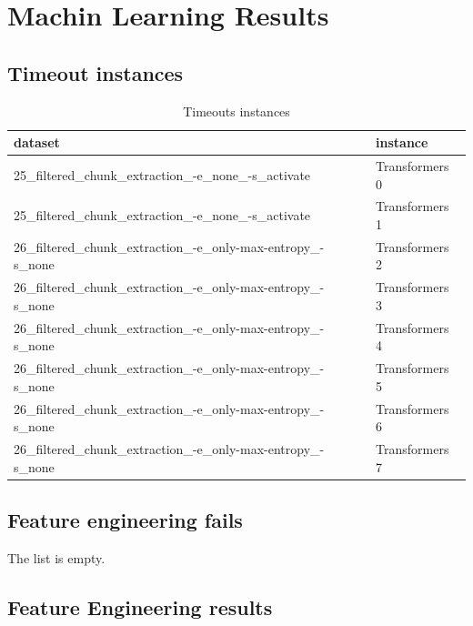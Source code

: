 \chapter{Machin Learning Results}
\section{Timeout instances}

\label{sec:annexe:timeout_instances}

\begin{table}[h]
\centering
\begin{tabular}{ll}
\hline
dataset & instance \\ 
\hline
25\_filtered\_chunk\_extraction\_-e\_none\_-s\_activate & Transformers 0 \\ 
25\_filtered\_chunk\_extraction\_-e\_none\_-s\_activate & Transformers 1 \\ 
26\_filtered\_chunk\_extraction\_-e\_only-max-entropy\_-s\_none & Transformers 2 \\ 
26\_filtered\_chunk\_extraction\_-e\_only-max-entropy\_-s\_none & Transformers 3 \\ 
26\_filtered\_chunk\_extraction\_-e\_only-max-entropy\_-s\_none & Transformers 4 \\ 
26\_filtered\_chunk\_extraction\_-e\_only-max-entropy\_-s\_none & Transformers 5 \\ 
26\_filtered\_chunk\_extraction\_-e\_only-max-entropy\_-s\_none & Transformers 6 \\ 
26\_filtered\_chunk\_extraction\_-e\_only-max-entropy\_-s\_none & Transformers 7 \\ 
\hline
\end{tabular}
\caption{Timeouts instances}
\label{tab:timeouts}
\end{table}

\section{Feature engineering fails}

\label{sec:annexe:feature_engineering_fails}

The list is empty.

\section{Feature Engineering results}

\label{sec:annexe:feature_engineering_results}

